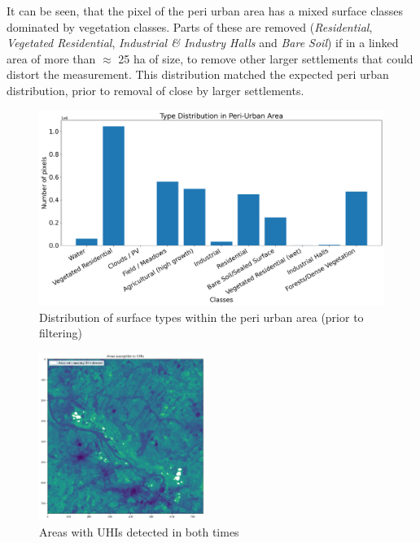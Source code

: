 \documentclass[12pt,a4paper, english,twoside]{scrartcl}
\begin{document}
      It can be seen, that the pixel of the peri urban area has a mixed surface classes dominated by vegetation classes. 
      Parts of these are removed (\textit{Residential}, \textit{Vegetated Residential}, \textit{Industrial \& Industry Halls} and \textit{Bare Soil}) if in a linked area of more than $\approx$ 25 ha of size, to remove other larger settlements that could distort the measurement.
      This distribution matched the expected peri urban distribution, prior to removal of close by larger settlements. \\
      \begin{figure}[!htbp]
         \centering
         \includegraphics[width=\textwidth]{img/ClassDistributionPU2019-06-29.png}
         \caption{Distribution of surface types within the peri urban area (prior to filtering)}\label{fig:classesPeri}
        \end{figure}
      \newpage
      \begin{figure}
        \vspace{-1cm}
         \begin{center}
          \includegraphics[width=0.48\textwidth]{img/overlap.png}
         \caption{Areas with UHIs detected in both times}\label{fig:uhiAffected}
         \end{center}
      \end{figure}
\end{document}
